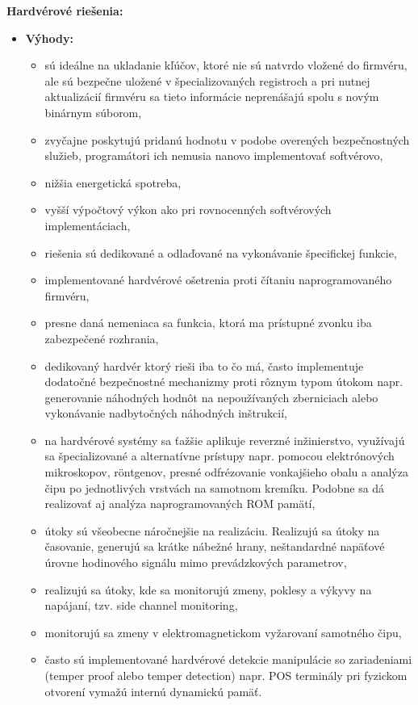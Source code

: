 \documentclass[12pt,a4paper,oneside,openright]{report}
\begin{document}
	\textbf{Hardvérové riešenia:}
	\begin{itemize}
		\item \textbf{Výhody:}
		\begin{itemize}
			\item sú ideálne na ukladanie kľúčov, ktoré nie sú natvrdo vložené do firmvéru, ale sú bezpečne uložené v špecializovaných registroch a pri nutnej aktualizácií firmvéru sa tieto informácie neprenášajú spolu s novým binárnym súborom,
			\item zvyčajne poskytujú pridanú hodnotu v podobe overených bezpečnostných služieb, programátori ich nemusia nanovo implementovať softvérovo, 
			\item nižšia energetická spotreba,
			\item vyšší výpočtový výkon ako pri rovnocenných softvérových implementáciach,
			\item riešenia sú dedikované a odlaďované na vykonávanie špecifickej funkcie,
			\item implementované hardvérové ošetrenia proti čítaniu naprogramovaného firmvéru,
			\item presne daná nemeniaca sa funkcia, ktorá ma prístupné zvonku iba zabezpečené rozhrania,
			\item dedikovaný hardvér ktorý rieši iba to čo má, často implementuje dodatočné bezpečnostné mechanizmy proti rôznym typom útokom napr. generovanie náhodných hodnôt na nepoužívaných zberniciach alebo vykonávanie nadbytočných náhodných inštrukcií,
			
			\item na hardvérové systémy sa ťažšie aplikuje reverzné inžinierstvo, využívajú sa špecializované a alternatívne prístupy napr. pomocou elektrónových mikroskopov, röntgenov, presné odfrézovanie vonkajšieho obalu a analýza čipu po jednotlivých vrstvách na samotnom kremíku. Podobne sa dá realizovať aj analýza naprogramovaných ROM pamätí,
			\item útoky sú všeobecne náročnejšie na realizáciu. Realizujú sa útoky na časovanie, generujú sa krátke nábežné hrany, neštandardné napäťové úrovne hodinového signálu mimo prevádzkových parametrov,  
			\item realizujú sa útoky, kde sa monitorujú zmeny, poklesy a výkyvy na napájaní, tzv. side channel monitoring,
			\item monitorujú sa zmeny v elektromagnetickom vyžarovaní samotného čipu,
			\item často sú implementované hardvérové detekcie manipulácie so zariadeniami (temper proof alebo temper detection) napr. POS terminály pri fyzickom otvorení vymažú internú dynamickú pamäť.			


\end{itemize}
\end{itemize}
\end{document}
